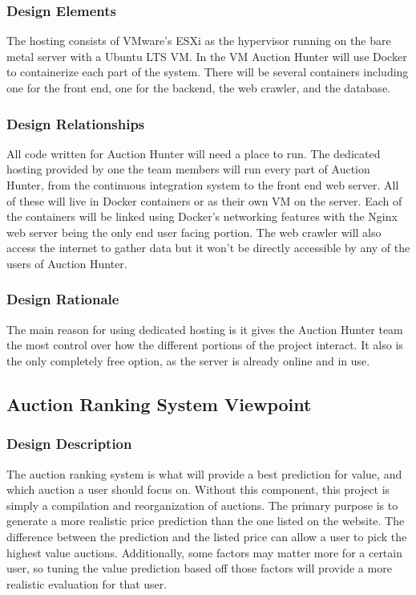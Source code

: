 \documentclass[onecolumn, draftclsnofoot, 10pt, compsoc]{IEEEtran}
\begin{document}
\subsubsection{Design Elements}
The hosting consists of VMware's ESXi as the hypervisor running on the bare metal server with a Ubuntu LTS VM. In the VM Auction Hunter will use Docker to containerize each part of the system. There will be several containers including one for the front end, one for the backend, the web crawler, and the database. 

\subsubsection{Design Relationships}
All code written for Auction Hunter will need a place to run. The dedicated hosting provided by one the team members will run every part of Auction Hunter, from the continuous integration system to the front end web server. All of these will live in Docker containers or as their own VM on the server. Each of the containers will be linked using Docker's networking features with the Nginx web server being the only end user facing portion. The web crawler will also access the internet to gather data but it won't be directly accessible by any of the users of Auction Hunter. 

\subsubsection{Design Rationale}
The main reason for using dedicated hosting is it gives the Auction Hunter team the most control over how the different portions of the project interact. It also is the only completely free option, as the server is already online and in use. 


\subsection{Auction Ranking System Viewpoint}
\subsubsection{Design Description}
The auction ranking system is what will provide a best prediction for value, and which auction a user should focus on. Without this component, this project is simply a compilation and reorganization of auctions. The primary purpose is to generate a more realistic price prediction than the one listed on the website. The difference between the prediction and the listed price can allow a user to pick the highest value auctions. Additionally, some factors may matter more for a certain user, so tuning the value prediction based off those factors will provide a more realistic evaluation for that user.  
\end{document}
